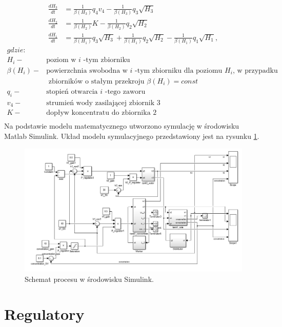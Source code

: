 \begin{align*}\label{rownania_stanu}
\frac{dH_{3}}{dt} &= \frac{1}{\beta(H_{3})} q_{4} v_{4}-\frac{1}{\beta(H_{3})} q_{3} \sqrt{H_{3}} \\
\frac{dH_{2}}{dt} &= \frac{1}{\beta(H_{2})} K-\frac{1}{\beta(H_{2})} q_{2} \sqrt{H_{2}} \\
\frac{dH_{1}}{dt} &= \frac{1}{\beta(H_{1})} q_{3} \sqrt{H_{3}}+\frac{1}{\beta(H_{1})} q_{2} \sqrt{H_{2}}-\frac{1}{\beta(H_{1})} q_{1} \sqrt{H_{1}},
\end{align*}
\begin{align*}
gdzie: &\\
	H_{i} -& \text{poziom w $i$ -tym zbiorniku}\\
	\beta(H_{i}) -& \text{powierzchnia swobodna w $i$ -tym zbiorniku dla poziomu $H_{i}$, w przypadku}\\ & \text{ zbiorników o stałym przekroju } \beta(H_{i})=const \\
	q_{i}  -& \text{stopień otwarcia $i$ -tego zaworu}\\
	v_{4}  -& \text{strumień wody zasilającej zbiornik 3}\\
	K -& \text{dopływ koncentratu do zbiornika 2}\\
\end{align*}
  Na podstawie modelu matematycznego utworzono symulację w środowisku Matlab Simulink. Układ modelu symulacyjnego przedstawiony jest na rysunku \ref{fig:Simulink_diagram}.
\begin{figure}[H]
	\centering
	\includegraphics[scale = 0.5]{fig/simulink_diagram.png}
	\caption{Schemat procesu w środowisku Simulink.}
	\label{fig:Simulink_diagram}
\end{figure}



\section{Regulatory}
